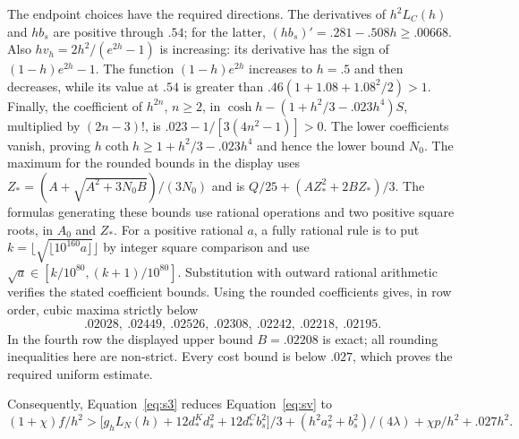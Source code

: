 The endpoint choices have the required directions.
The derivatives of $h^2L_C(h)$ and $hb_s$ are positive through $.54$;
for the latter, $(hb_s)'=.281-.508h\ge.00668$.
Also $hv_h=2h^2/(e^{2h}-1)$ is increasing: its derivative has the sign
of $(1-h)e^{2h}-1$. The function $(1-h)e^{2h}$ increases to $h=.5$
and then decreases, while its value at $.54$ is greater than
$.46(1+1.08+1.08^2/2)>1$.
Finally, the coefficient of $h^{2n}$, $n\ge2$, in
$\cosh h-(1+h^2/3-.023h^4)S$, multiplied by $(2n-3)!$, is
$.023-1/[3(4n^2-1)]>0$. The lower coefficients vanish, proving
$h\coth h\ge1+h^2/3-.023h^4$ and hence the lower bound $N_0$. The maximum for the rounded bounds in the display uses \(Z_*=(A+\sqrt{A^2+3N_0 B})/(3N_0)\) and is \(Q/25+(A Z_*^2+2B Z_*)/3\). The formulas generating these bounds use rational operations and two
positive square roots, in $A_0$ and $Z_*$. For a positive rational $a$, a fully rational
rule is to put $k=\lfloor\sqrt{\lfloor10^{160}a\rfloor}\rfloor$ by
integer square comparison and use
$\sqrt a\in[k/10^{80},(k+1)/10^{80}]$. Substitution with outward
rational arithmetic verifies the stated coefficient bounds. Using the rounded coefficients gives, in row order, cubic
maxima strictly below
\[
 .02028,\ .02449,\ .02526,\ .02308,\ .02242,\ .02218,\ .02195.
\]
In the fourth row the displayed upper bound $B=.02208$ is exact;
all rounding inequalities here are non-strict. Every cost bound is below
$.027$, which proves the required uniform estimate.

Consequently, Equation~\eqref{eq:s3} reduces Equation~\eqref{eq:sv} to
\[
 (1+\chi) f/h^2 >
 \big[g_h L_N(h)+12d_*^K d_s^2+12d_*^C b_s^2\big]/3+
 (h^2 a_s^2+b_s^2)/(4\lambda)+\chi p/h^2+.027h^2.                                 \tag{s5}\label{eq:s5}
\]

